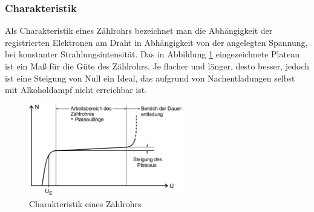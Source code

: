 \subsubsection*{Charakteristik}
Als Charakteristik eines Zählrohrs bezeichnet man die Abhängigkeit der registrierten Elektronen am Draht in Abhängigkeit von der angelegten Spannung, bei konstanter Strahlungsintensität. Das in Abbildung \ref{fig:Charakteristik} eingezeichnete Plateau ist ein Maß für die Güte des Zählrohrs. Je flacher und länger, desto besser, jedoch ist eine Steigung von Null ein Ideal, das aufgrund von Nachentladungen selbst mit Alkoholdampf nicht erreichbar ist.
\begin{figure}[h!]
	\centering
	\includegraphics[width=0.6\textwidth]{Charakteristik.pdf}
	\caption{Charakteristik eines Zählrohrs}
	\label{fig:Charakteristik}
\end{figure}